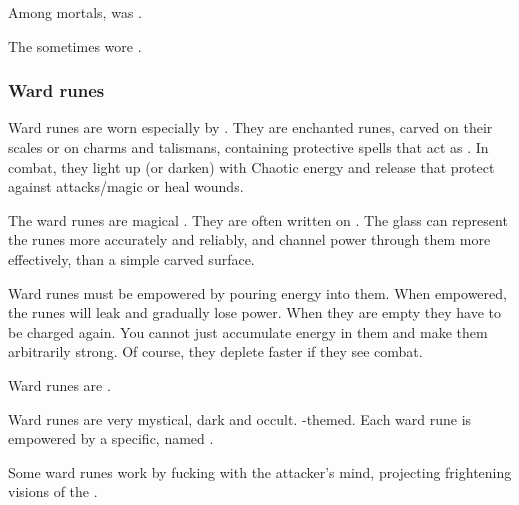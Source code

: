 Among mortals, \armour was . 

The \resphain sometimes wore . 





\subsubsection{Ward runes}
Ward runes are worn especially by \dragons. 
They are enchanted runes, carved on their scales or on charms and talismans, containing protective spells that act as \armour. 
In combat, they light up (or darken) with Chaotic energy and release  that protect against attacks/magic or heal wounds. 

The ward runes are magical  . 
They are often written on . 
The glass can represent the runes more accurately and reliably, and channel power through them more effectively, than a simple carved surface. 

Ward runes must be empowered by pouring energy into them. 
When empowered, the runes will leak and gradually lose power. 
When they are empty they have to be charged again. 
You cannot just accumulate energy in them and make them arbitrarily strong. 
Of course, they deplete faster if they see combat. 

Ward runes are . 

Ward runes are very mystical, dark and occult. 
\XzaiShann-themed. 
Each ward rune is empowered by a specific, named \xs. 


Some \xs ward runes work by fucking with the attacker's mind, projecting frightening visions of the \xs.










